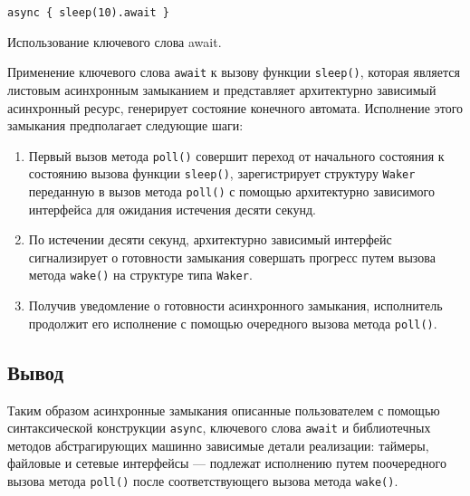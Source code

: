 \begin{listing}[H]
    \begin{verbatim}
async { sleep(10).await }
    \end{verbatim}

    \caption{Использование ключевого слова await.}
    \label{listing:async_sleep}
\end{listing}

Применение ключевого слова \verb|await| к вызову функции \verb|sleep()|, которая является листовым асинхронным замыканием и представляет архитектурно зависимый асинхронный ресурс, генерирует состояние конечного автомата. Исполнение этого замыкания предполагает следующие шаги:

\begin{enumerate}
    \item Первый вызов метода \verb|poll()| совершит переход от начального состояния к состоянию вызова функции \verb|sleep()|, зарегистрирует структуру \verb|Waker| переданную в вызов метода \verb|poll()| с помощью архитектурно зависимого интерфейса для ожидания истечения десяти секунд.
    \item По истечении десяти секунд, архитектурно зависимый интерфейс сигнализирует о готовности замыкания совершать прогресс путем вызова метода \verb|wake()| на структуре типа \verb|Waker|.
    \item Получив уведомление о готовности асинхронного замыкания, исполнитель продолжит его исполнение с помощью очередного вызова метода \verb|poll()|.
\end{enumerate}

\subsection{Вывод}

Таким образом асинхронные замыкания описанные пользователем с помощью синтаксической конструкции \verb|async|, ключевого слова \verb|await| и библиотечных методов абстрагирующих машинно зависимые детали реализации: таймеры, файловые и сетевые интерфейсы --- подлежат исполнению путем поочередного вызова метода \verb|poll()| после соответствующего вызова метода \verb|wake()|.
